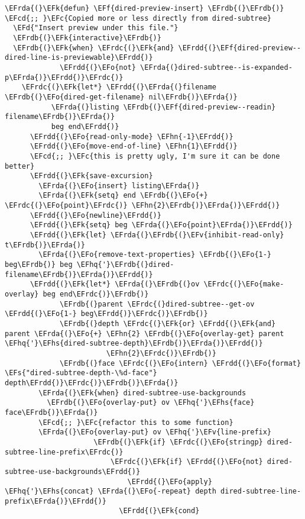 \documentclass[a4wide,10pt]{article}
\newcommand{\EFc}[1]{\textcolor{EFc}{#1}} %
\newcommand{\EFcd}[1]{\textcolor{EFcd}{#1}} %
\newcommand{\EFs}[1]{\textcolor{EFs}{#1}} %
\newcommand{\EFd}[1]{\textcolor{EFd}{#1}} %
\newcommand{\EFk}[1]{\textcolor{EFk}{#1}} %
\newcommand{\EFf}[1]{\textcolor{EFf}{#1}} %
\newcommand{\EFv}[1]{\textcolor{EFv}{#1}} %
\newcommand{\EFo}[1]{\textcolor{EFo}{#1}} %
\newcommand{\EFhn}[1]{\textcolor{EFhn}{\textbf{#1}}} %
\newcommand{\EFhq}[1]{\textcolor{EFhq}{#1}} %
\newcommand{\EFhs}[1]{\textcolor{EFhs}{#1}} %
\newcommand{\EFrda}[1]{\textcolor{EFrda}{#1}} %
\newcommand{\EFrdb}[1]{\textcolor{EFrdb}{#1}} %
\newcommand{\EFrdc}[1]{\textcolor{EFrdc}{#1}} %
\newcommand{\EFrdd}[1]{\textcolor{EFrdd}{#1}} %
\begin{document}
\begin{Code}
\begin{Verbatim}
\EFrda{(}\EFk{defun} \EFf{dired-preview-insert} \EFrdb{(}\EFrdb{)}          \EFcd{;; }\EFc{Copied more or less directly from dired-subtree}
  \EFd{"Insert preview under this file."}
  \EFrdb{(}\EFk{interactive}\EFrdb{)}
  \EFrdb{(}\EFk{when} \EFrdc{(}\EFk{and} \EFrdd{(}\EFf{dired-preview--dired-line-is-previewable}\EFrdd{)}
             \EFrdd{(}\EFo{not} \EFrda{(}dired-subtree--is-expanded-p\EFrda{)}\EFrdd{)}\EFrdc{)}
    \EFrdc{(}\EFk{let*} \EFrdd{(}\EFrda{(}filename \EFrdb{(}\EFo{dired-get-filename} nil\EFrdb{)}\EFrda{)}
           \EFrda{(}listing \EFrdb{(}\EFf{dired-preview--readin} filename\EFrdb{)}\EFrda{)}
           beg end\EFrdd{)}
      \EFrdd{(}\EFo{read-only-mode} \EFhn{-1}\EFrdd{)}
      \EFrdd{(}\EFo{move-end-of-line} \EFhn{1}\EFrdd{)}
      \EFcd{;; }\EFc{this is pretty ugly, I'm sure it can be done better}
      \EFrdd{(}\EFk{save-excursion}
        \EFrda{(}\EFo{insert} listing\EFrda{)}
        \EFrda{(}\EFk{setq} end \EFrdb{(}\EFo{+} \EFrdc{(}\EFo{point}\EFrdc{)} \EFhn{2}\EFrdb{)}\EFrda{)}\EFrdd{)}
      \EFrdd{(}\EFo{newline}\EFrdd{)}
      \EFrdd{(}\EFk{setq} beg \EFrda{(}\EFo{point}\EFrda{)}\EFrdd{)}
      \EFrdd{(}\EFk{let} \EFrda{(}\EFrdb{(}\EFv{inhibit-read-only} t\EFrdb{)}\EFrda{)}
        \EFrda{(}\EFo{remove-text-properties} \EFrdb{(}\EFo{1-} beg\EFrdb{)} beg \EFhq{'}\EFrdb{(}dired-filename\EFrdb{)}\EFrda{)}\EFrdd{)}
      \EFrdd{(}\EFk{let*} \EFrda{(}\EFrdb{(}ov \EFrdc{(}\EFo{make-overlay} beg end\EFrdc{)}\EFrdb{)}
             \EFrdb{(}parent \EFrdc{(}dired-subtree--get-ov \EFrdd{(}\EFo{1-} beg\EFrdd{)}\EFrdc{)}\EFrdb{)}
             \EFrdb{(}depth \EFrdc{(}\EFk{or} \EFrdd{(}\EFk{and} parent \EFrda{(}\EFo{+} \EFhn{2} \EFrdb{(}\EFo{overlay-get} parent \EFhq{'}\EFhs{dired-subtree-depth}\EFrdb{)}\EFrda{)}\EFrdd{)}
                        \EFhn{2}\EFrdc{)}\EFrdb{)}
             \EFrdb{(}face \EFrdc{(}\EFo{intern} \EFrdd{(}\EFo{format} \EFs{"dired-subtree-depth-\%d-face"} depth\EFrdd{)}\EFrdc{)}\EFrdb{)}\EFrda{)}
        \EFrda{(}\EFk{when} dired-subtree-use-backgrounds
          \EFrdb{(}\EFo{overlay-put} ov \EFhq{'}\EFhs{face} face\EFrdb{)}\EFrda{)}
        \EFcd{;; }\EFc{refactor this to some function}
        \EFrda{(}\EFo{overlay-put} ov \EFhq{'}\EFv{line-prefix}
                     \EFrdb{(}\EFk{if} \EFrdc{(}\EFo{stringp} dired-subtree-line-prefix\EFrdc{)}
                         \EFrdc{(}\EFk{if} \EFrdd{(}\EFo{not} dired-subtree-use-backgrounds\EFrdd{)}
                             \EFrdd{(}\EFo{apply} \EFhq{'}\EFhs{concat} \EFrda{(}\EFo{-repeat} depth dired-subtree-line-prefix\EFrda{)}\EFrdd{)}
                           \EFrdd{(}\EFk{cond}

\end{Verbatim}
\end{Code}
\end{document}
